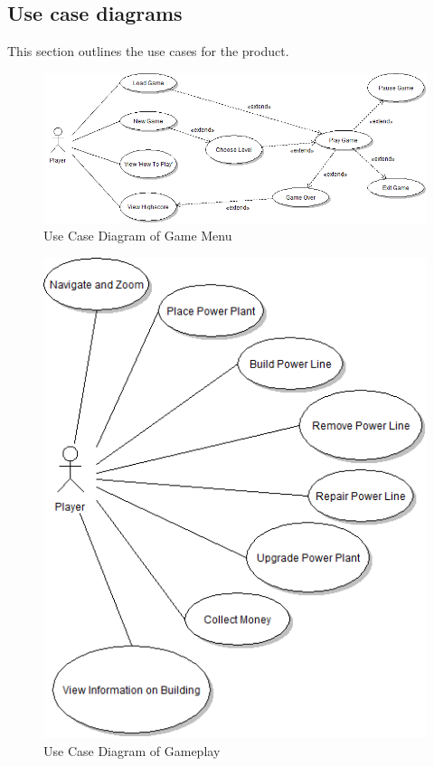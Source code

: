 \subsection{Use case diagrams}

This section outlines the use cases for the product.

\begin{figure}[H]
  	\centering
	\includegraphics[scale=0.45]{pictures/UCD_Menu.png}
	\caption{Use Case Diagram of Game Menu}
\end{figure}

\begin{figure}[H]
  	\centering
	\includegraphics[scale=0.5]{pictures/UCD_PlayGame.png}
	\caption{Use Case Diagram of Gameplay}
\end{figure}

